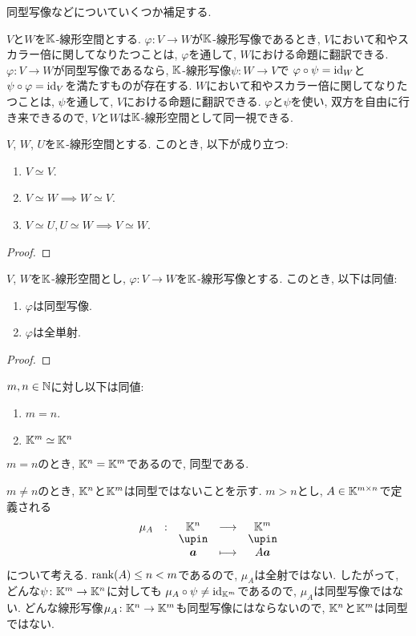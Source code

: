 同型写像などについていくつか補足する.

\begin{remark}
  $V$と$W$を$\mathbb{K}$-線形空間とする.
  $\varphi\colon V\to W$が$\mathbb{K}$-線形写像であるとき,
  $V$において和やスカラー倍に関してなりたつことは,
  $\varphi$を通して, $W$における命題に翻訳できる.
  $\varphi\colon V\to W$が同型写像であるなら,
  $\mathbb{K}$-線形写像$\psi\colon W\to V$で
  $\varphi\circ \psi=\operatorname{id}_W$と
  $\psi\circ \varphi=\operatorname{id}_V$を満たすものが存在する.
  $W$において和やスカラー倍に関してなりたつことは,
  $\psi$を通して, $V$における命題に翻訳できる.
  $\varphi$と$\psi$を使い, 双方を自由に行き来できるので,
  $V$と$W$は$\mathbb{K}$-線形空間として同一視できる.
\end{remark}

\begin{prop}
  $V$, $W$, $U$を$\mathbb{K}$-線形空間とする.
  このとき, 以下が成り立つ:
  \begin{enumerate}
  \item $V\simeq V$.
  \item $V\simeq W \implies W\simeq V$.
  \item $V\simeq U, U\simeq W \implies V\simeq W$.
  \end{enumerate}
\end{prop}
\begin{proof}\end{proof}

\begin{prop}
  $V$, $W$を$\mathbb{K}$-線形空間とし, $\varphi\colon V\to W$を$\mathbb{K}$-線形写像とする.
  このとき, 以下は同値:
  \begin{enumerate}
  \item $\varphi$は同型写像.
  \item $\varphi$は全単射.
  \end{enumerate}
\end{prop}
\begin{proof}\end{proof}

\begin{lemma}
   $m,n\in\mathbb{N}$に対し以下は同値:
  \begin{enumerate}
  \item $m=n$.
  \item $\mathbb{K}^m \simeq \mathbb{K}^n$
  \end{enumerate}
\end{lemma}
\begin{example}
  $m=n$のとき, $\mathbb{K}^n=\mathbb{K}^m$であるので, 同型である.

  $m\neq n$のとき, $\mathbb{K}^n$と$\mathbb{K}^m$は同型ではないことを示す.
  $m>n$とし, $A\in \mathbb{K}^{m\times n}$で定義される
  \begin{align*}
    \shazo{\mu_A}{\KK^n}{\KK^m}
    {\aaa}{A\aaa}
  \end{align*}
  について考える.
  $\operatorname{rank}(A)\leq n<m$であるので, $\mu_A$は全射ではない.
  したがって,
  どんな$\psi\colon \mathbb{K}^m\to \mathbb{K}^n$に対しても
  $\mu_A\circ\psi\neq \operatorname{id}_{\mathbb{K}^m}$であるので,
  $\mu_A$は同型写像ではない.
  どんな線形写像$\mu_A\colon \mathbb{K}^n \to \mathbb{K}^m$も同型写像にはならないので,
  $\mathbb{K}^n$と$\mathbb{K}^m$は同型ではない.
\end{example}

